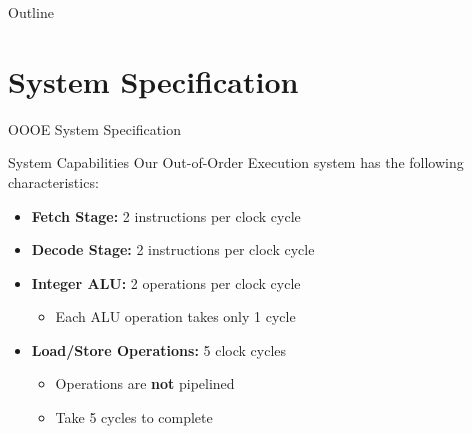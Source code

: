 \documentclass[aspectratio=169,12pt]{beamer}
\begin{document}
\begin{frame}
\titlepage
\end{frame}

\begin{frame}{Outline}
\tableofcontents
\end{frame}

\section{System Specification}

\begin{frame}{OOOE System Specification}
\begin{block}{System Capabilities}
Our Out-of-Order Execution system has the following characteristics:
\end{block}

\begin{itemize}
    \item \textbf{Fetch Stage:} 2 instructions per clock cycle
    \item \textbf{Decode Stage:} 2 instructions per clock cycle  
    \item \textbf{Integer ALU:} 2 operations per clock cycle
    \begin{itemize}
        \item Each ALU operation takes only 1 cycle
    \end{itemize}
    \item \textbf{Load/Store Operations:} 5 clock cycles
    \begin{itemize}
        \item Operations are \textbf{not} pipelined
        \item Take 5 cycles to complete
    \end{itemize}
\end{itemize}
\end{frame}
\end{document}
